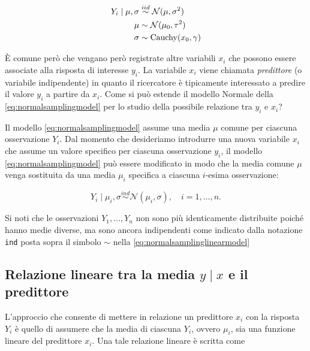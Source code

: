 \documentclass[
  11pt,
]{krantz}
\DeclareMathOperator{\Cauchy}{Cauchy} %
\theoremstyle{definition}
\theoremstyle{definition}
\theoremstyle{definition}
\theoremstyle{definition}
\theoremstyle{remark}
\begin{document}
\begin{align}
Y_i \mid \mu, \sigma & \stackrel{iid}{\sim} \mathcal{N}(\mu, \sigma^2)\notag\\
\mu       & \sim \mathcal{N}(\mu_0, \tau^2) \notag\\
\sigma    & \sim \Cauchy(x_0, \gamma) \notag
\end{align}

È comune però che vengano però registrate altre variabili \(x_i\) che possono essere associate alla risposta di interesse \(y_i\). La variabile \(x_i\) viene chiamata \emph{predittore} (o variabile indipendente) in quanto il ricercatore è tipicamente interessato a predire il valore \(y_i\) a partire da \(x_i\). Come si può estende il modello Normale della \eqref{eq:normalsamplingmodel} per lo studio della possibile relazione tra \(y_i\) e \(x_i\)?

Il modello \eqref{eq:normalsamplingmodel} assume una media \(\mu\) comune per ciascuna osservazione \(Y_i\). Dal momento che desideriamo introdurre una nuova variabile \(x_i\) che assume un valore specifico per ciascuna osservazione \(y_i\), il modello \eqref{eq:normalsamplingmodel} può essere modificato in modo che la media comune \(\mu\) venga sostituita da una media \(\mu_i\) specifica a ciascuna \(i\)-esima osservazione:

\begin{equation}
Y_i \mid \mu_i, \sigma \stackrel{ind}{\sim} \mathcal{N}(\mu_i, \sigma), \quad i = 1, \dots, n.
\label{eq:normalsamplinglinearmodel}
\end{equation}

Si noti che le osservazioni \(Y_1, \dots, Y_n\) non sono più identicamente distribuite poiché hanno medie diverse, ma sono ancora indipendenti come indicato dalla notazione \texttt{ind} posta sopra il simbolo \(\sim\) nella \eqref{eq:normalsamplinglinearmodel}

\hypertarget{relazione-lineare-tra-la-media-y-mid-x-e-il-predittore}{%
\subsection{\texorpdfstring{Relazione lineare tra la media \(y \mid x\) e il predittore}{Relazione lineare tra la media y \textbackslash mid x e il predittore}}\label{relazione-lineare-tra-la-media-y-mid-x-e-il-predittore}}

L'approccio che consente di mettere in relazione un predittore \(x_i\) con la risposta \(Y_i\) è quello di assumere che la media di ciascuna \(Y_i\), ovvero \(\mu_i\), sia una funzione lineare del predittore \(x_i\). Una tale relazione lineare è scritta come
\end{document}
